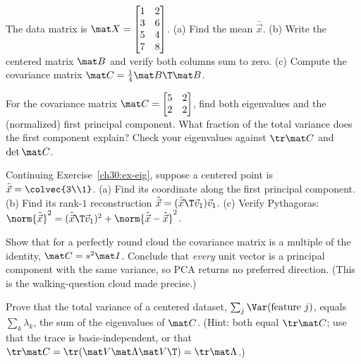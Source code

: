 \begin{exercise}\label{ch30:ex-center}
The data matrix is $\mat X=\begin{bmatrix}1&2\\3&6\\5&4\\7&8\end{bmatrix}$.
(a) Find the mean $\bar{\vec x}$. (b) Write the centered matrix $\mat B$ and verify
both columns sum to zero. (c) Compute the covariance matrix $\mat C=\tfrac14\mat
B\T\mat B$.
\end{exercise}

\begin{exercise}\label{ch30:ex-eig}
For the covariance matrix $\mat C=\begin{bmatrix}5&2\\2&2\end{bmatrix}$, find both
eigenvalues and the (normalized) first principal component. What fraction of the
total variance does the first component explain? Check your eigenvalues against
$\tr\mat C$ and $\det\mat C$.
\end{exercise}

\begin{exercise}\label{ch30:ex-project}
Continuing Exercise~\ref{ch30:ex-eig}, suppose a centered point is
$\tilde{\vec x}=\colvec{3\\1}$. (a) Find its coordinate along the first principal
component. (b) Find its rank-$1$ reconstruction $\hat{\vec x}=(\tilde{\vec
x}\T\vec v_1)\vec v_1$. (c) Verify Pythagoras: $\norm{\tilde{\vec
x}}^2=(\tilde{\vec x}\T\vec v_1)^2+\norm{\tilde{\vec x}-\hat{\vec x}}^2$.
\end{exercise}

\begin{exercise}\label{ch30:ex-round}
Show that for a perfectly round cloud the covariance matrix is a multiple of the
identity, $\mat C=s^2\mat I$. Conclude that \emph{every} unit vector is a principal
component with the same variance, so PCA returns no preferred direction. (This is
the walking-question cloud made precise.)
\end{exercise}

\begin{exercise}\label{ch30:ex-trace}
Prove that the total variance of a centered dataset, $\sum_j\Var(\text{feature }j)$,
equals $\sum_k\lambda_k$, the sum of the eigenvalues of $\mat C$. (Hint: both equal
$\tr\mat C$; use that the trace is basis-independent, or that
$\tr\mat C=\tr(\mat V\mat\Lambda\mat V\T)=\tr\mat\Lambda$.)
\end{exercise}

